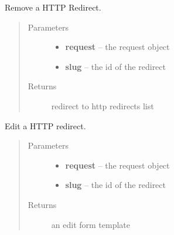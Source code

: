 \documentclass[letterpaper,10pt,english]{sphinxmanual}
\begin{document}

\begin{fulllineitems}
\label{api/web:limeade.web.views.redirect_delete}
Remove a HTTP Redirect.
\begin{quote}\begin{description}
\item[{Parameters}] \leavevmode\begin{itemize}
\item {} 
\textbf{request} -- the request object

\item {} 
\textbf{slug} -- the id of the redirect

\end{itemize}

\item[{Returns}] \leavevmode
redirect to http redirects list

\end{description}\end{quote}

\end{fulllineitems}


\begin{fulllineitems}
\label{api/web:limeade.web.views.redirect_edit}
Edit a HTTP redirect.
\begin{quote}\begin{description}
\item[{Parameters}] \leavevmode\begin{itemize}
\item {} 
\textbf{request} -- the request object

\item {} 
\textbf{slug} -- the id of the redirect

\end{itemize}

\item[{Returns}] \leavevmode
an edit form template

\end{description}\end{quote}

\end{fulllineitems}
\end{document}
